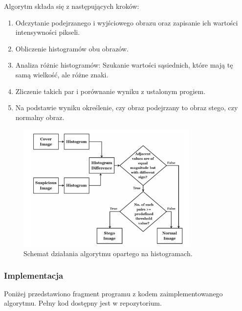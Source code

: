 Algorytm składa się z następujących kroków:
\begin{enumerate}
    \item Odczytanie podejrzanego i wyjściowego obrazu oraz zapisanie ich wartości intensywności pikseli.
    \item Obliczenie histogramów obu obrazów.
    \item Analiza różnic histogramów: Szukanie wartości sąsiednich, które mają tę samą wielkość, ale różne 
    znaki.
    \item Zliczenie takich par i porównanie wyniku z ustalonym progiem.
    \item Na podstawie wyniku określenie, czy obraz podejrzany to obraz stego, czy normalny obraz.
\end{enumerate}

\begin{figure}[htbp]
    \centering
    \includegraphics[width=0.8\textwidth]{./img/hist_algorythm.png}
    \caption{Schemat działania algorytmu opartego na histogramach.}
    \label{fig:histogram_algorithm}
\end{figure}

\subsubsection{Implementacja}
Poniżej przedstawiono fragment programu z kodem zaimplementowanego algorytmu. Pełny kod dostępny jest w 
repozytorium.

